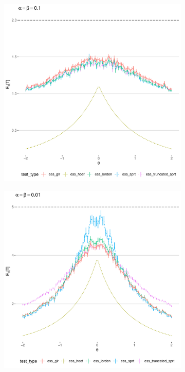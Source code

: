 \documentclass[11pt]{article}
\begin{document}
\begin{figure}[hp]
\centering
\begin{subfigure}{0.49\textwidth}
    \includegraphics[width=\textwidth]{images/ess_alpha1e1}
\end{subfigure}
\hfill
\begin{subfigure}{0.49\textwidth}
    \includegraphics[width=\textwidth]{images/ess_alpha1e2}

\end{subfigure}
\end{figure}
\end{document}
